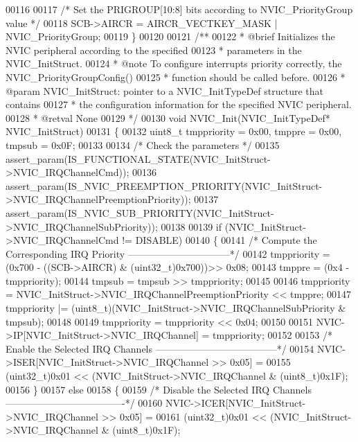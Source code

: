 \begin{DoxyCode}
00116 
00117   \textcolor{comment}{/* Set the PRIGROUP[10:8] bits according to NVIC\_PriorityGroup value */}
00118   SCB->AIRCR = AIRCR_VECTKEY_MASK | NVIC\_PriorityGroup;
00119 \}
00120 
00121 \textcolor{comment}{/**}
00122 \textcolor{comment}{  * @brief  Initializes the NVIC peripheral according to the specified}
00123 \textcolor{comment}{  *         parameters in the NVIC\_InitStruct.}
00124 \textcolor{comment}{  * @note   To configure interrupts priority correctly, the NVIC\_PriorityGroupConfig()}
00125 \textcolor{comment}{  *         function should be called before. }
00126 \textcolor{comment}{  * @param  NVIC\_InitStruct: pointer to a NVIC\_InitTypeDef structure that contains}
00127 \textcolor{comment}{  *         the configuration information for the specified NVIC peripheral.}
00128 \textcolor{comment}{  * @retval None}
00129 \textcolor{comment}{  */}
00130 \textcolor{keywordtype}{void} NVIC_Init(NVIC\_InitTypeDef* NVIC\_InitStruct)
00131 \{
00132   uint8\_t tmppriority = 0x00, tmppre = 0x00, tmpsub = 0x0F;
00133 
00134   \textcolor{comment}{/* Check the parameters */}
00135   assert_param(IS\_FUNCTIONAL\_STATE(NVIC\_InitStruct->NVIC\_IRQChannelCmd));
00136   assert_param(IS\_NVIC\_PREEMPTION\_PRIORITY(NVIC\_InitStruct->NVIC\_IRQChannelPreemptionPriority));
00137   assert_param(IS\_NVIC\_SUB\_PRIORITY(NVIC\_InitStruct->NVIC\_IRQChannelSubPriority));
00138 
00139   \textcolor{keywordflow}{if} (NVIC\_InitStruct->NVIC_IRQChannelCmd != DISABLE)
00140   \{
00141     \textcolor{comment}{/* Compute the Corresponding IRQ Priority --------------------------------*/}
00142     tmppriority = (0x700 - ((SCB->AIRCR) & (uint32\_t)0x700))>> 0x08;
00143     tmppre = (0x4 - tmppriority);
00144     tmpsub = tmpsub >> tmppriority;
00145 
00146     tmppriority = NVIC\_InitStruct->NVIC_IRQChannelPreemptionPriority << tmppre;
00147     tmppriority |=  (uint8\_t)(NVIC\_InitStruct->NVIC_IRQChannelSubPriority & tmpsub);
00148 
00149     tmppriority = tmppriority << 0x04;
00150 
00151     NVIC->IP[NVIC\_InitStruct->NVIC\_IRQChannel] = tmppriority;
00152 
00153     \textcolor{comment}{/* Enable the Selected IRQ Channels --------------------------------------*/}
00154     NVIC->ISER[NVIC\_InitStruct->NVIC\_IRQChannel >> 0x05] =
00155       (uint32\_t)0x01 << (NVIC\_InitStruct->NVIC\_IRQChannel & (uint8\_t)0x1F);
00156   \}
00157   \textcolor{keywordflow}{else}
00158   \{
00159     \textcolor{comment}{/* Disable the Selected IRQ Channels -------------------------------------*/}
00160     NVIC->ICER[NVIC\_InitStruct->NVIC\_IRQChannel >> 0x05] =
00161       (uint32\_t)0x01 << (NVIC\_InitStruct->NVIC\_IRQChannel & (uint8\_t)0x1F);

\end{DoxyCode}
